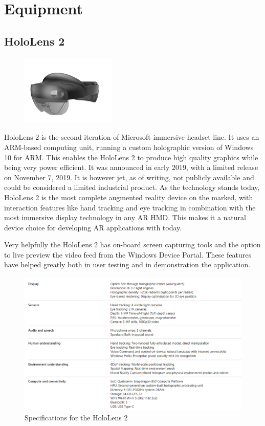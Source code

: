 


\section{Equipment}

\subsection*{HoloLens 2}\label{chap:hololens2}

\begin{figure}[ht]
    \centering
    \includegraphics[width=0.4\textwidth]{fig/hololens2}
\end{figure}

HoloLens 2 is the second iteration of Microsoft immersive headset line. It uses an ARM-based computing unit, running a custom holographic version of Windows 10 for ARM. This enables the HoloLens 2 to produce high quality graphics while being very power efficient. It was announced in early 2019, with a limited release on November 7, 2019. It is however jet, as of writing, not publicly available and could be considered a limited industrial product.
As the technology stands today, HoloLens 2 is the most complete augmented reality device on the marked, with interaction features like hand tracking and eye tracking in combination with the most immersive display technology in any AR HMD. This makes it a natural device choice for developing AR applications with today. \author{fig:specshololens2}
Very helpfully the HoloLens 2 has on-board screen capturing tools and the option to live preview the video feed from the Windows Device Portal. These features have helped greatly both in user testing and in demonstration the application.

\begin{figure}[ht]
    \includegraphics[width=\textwidth]{fig/hololens2specs}
    \caption{Specifications for the HoloLens 2}
    \label{fig:specshololens2}
\end{figure}

